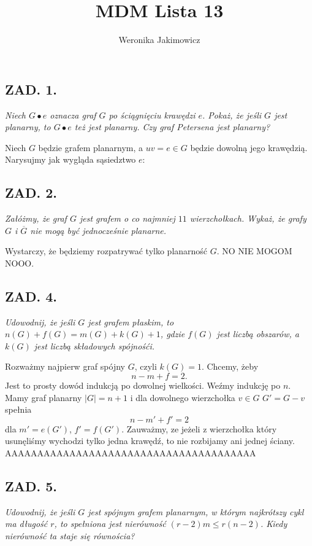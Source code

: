 \documentclass{article}
\author{Weronika Jakimowicz}
\title{MDM Lista 13}
\date{}
\begin{document}
\maketitle
\thispagestyle{empty}

\subsection*{ZAD. 1.}
\emph{Niech $G\bullet e$ oznacza graf $G$ po ściągnięciu krawędzi $e$. Pokaż, że jeśli $G$ jest planarny, to $G\bullet e$ też jest planarny. Czy graf Petersena jest planarny?}
\medskip

\medskip
Niech $G$ będzie grafem planarnym, a $uv=e\in G$ będzie dowolną jego krawędzią. Narysujmy jak wygląda sąsiedztwo $e$:

\subsection*{ZAD. 2.}
\emph{Załóżmy, że graf $G$ jest grafem o co najmniej $11$ wierzchołkach. Wykaż, że grafy $G$ i $\overline G$ nie mogą być jednocześnie planarne.}
\medskip

\medskip

Wystarczy, że będziemy rozpatrywać tylko planarność $G$. NO NIE MOGOM NOOO.

\subsection*{ZAD. 4.}
\emph{Udowodnij, że jeśli $G$ jest grafem płaskim, to $n(G)+f(G)=m(G)+k(G)+1$, gdzie $f(G)$ jest liczbą obszarów, a $k(G)$ jest liczbą składowych spójnośći.}
\medskip

\medskip

Rozważmy najpierw graf spójny $G$, czyli $k(G)=1$. Chcemy, żeby
$$n-m+f=2.$$
Jest to prosty dowód indukcją po dowolnej wielkości. Weźmy indukcję po $n$. Mamy graf planarny $|G|=n+1$ i dla dowolnego wierzchołka $v\in G$ $G'=G-v$ spełnia
$$n-m'+f'=2$$
dla $m'=e(G')$, $f'=f(G')$. Zauważmy, ze jeżeli z wierzchołka który usunęliśmy wychodzi tylko jedna krawędź, to nie rozbijamy ani jednej ściany. AAAAAAAAAAAAAAAAAAAAAAAAAAAAAAAAAAAAAAA

\subsection*{ZAD. 5.}
\emph{Udowodnij, że jeśli $G$ jest spójnym grafem planarnym, w którym najkrótszy cykl ma długość $r$, to spełniona jest nierówność $(r-2)m\leq r(n-2)$. Kiedy nierówność ta staje się równościa?}
\medskip
\end{document}
